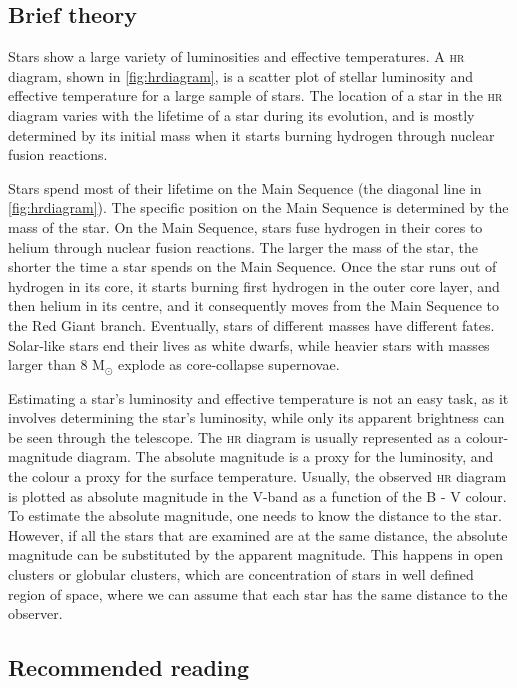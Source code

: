 \documentclass[a4paper, 11pt, fleqn]{memoir}
\begin{document}
\subsection{Brief theory}

Stars show a large variety of luminosities and effective temperatures.
A \textsc{hr} diagram, shown in \cref{fig:hrdiagram}, is a scatter plot of stellar luminosity and effective temperature for a large sample of stars.
The location of a star in the \textsc{hr} diagram varies with the lifetime of a star during its evolution, and is mostly determined by its initial mass when it starts burning hydrogen through nuclear fusion reactions.

Stars spend most of their lifetime on the Main Sequence (the diagonal line in \cref{fig:hrdiagram}).
The specific position on the Main Sequence is determined by the mass of the star.
On the Main Sequence, stars fuse hydrogen in their cores to helium through nuclear fusion reactions.
The larger the mass of the star, the shorter the time a star spends on the Main Sequence.
Once the star runs out of hydrogen in its core, it starts burning first hydrogen in the outer core layer, and then helium in its centre, and it consequently moves from the Main Sequence to the Red Giant branch.
Eventually, stars of different masses have different fates.
Solar-like stars end their lives as white dwarfs, while heavier stars with masses larger than 8 M$_{\odot}$
explode as core-collapse supernovae.

Estimating a star's luminosity and effective temperature is not an easy task, as it involves determining the star's luminosity, while only its apparent brightness can be seen through the telescope.
The \textsc{hr} diagram is usually represented as a colour-magnitude diagram.
The absolute magnitude is a proxy for the luminosity, and the colour a proxy for the surface temperature.
Usually, the observed \textsc{hr} diagram is plotted as absolute magnitude in the V-band as a function of the B - V colour.
To estimate the absolute magnitude, one needs to know the distance to the star.
However, if all the stars that are examined are at the same distance, the absolute magnitude can be substituted by the apparent magnitude.
This happens in open clusters or globular clusters, which are concentration of stars in well defined region of space, where we can assume that each star has the same distance to the observer.

\subsection{Recommended reading}
\end{document}
